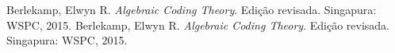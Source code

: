 \begin{thebibliography}{1}

Berlekamp, Elwyn R. \emph{Algebraic Coding Theory}. Edição revisada. Singapura: WSPC, 2015. 
Berlekamp, Elwyn R. \emph{Algebraic Coding Theory}. Edição revisada. Singapura: WSPC, 2015. 

\end{thebibliography}